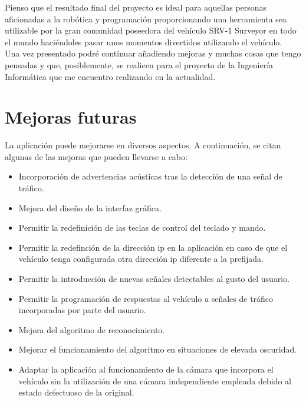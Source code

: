 Pienso que el resultado final del proyecto es ideal para aquellas personas aficionadas a la robótica y programación proporcionando una herramienta sea utilizable por la gran comunidad poseedora del vehículo SRV-1 Surveyor en todo el mundo haciéndoles pasar unos momentos divertidos utilizando el vehículo.\\

Una vez presentado podré continuar añadiendo mejoras y muchas cosas que tengo pensadas y que, posiblemente, se realicen para el proyecto de la Ingeniería Informática que me encuentro realizando en la actualidad.

\section{Mejoras futuras}

La aplicación puede mejorarse en diversos aspectos. A continuación, se citan algunas de las mejoras que pueden llevarse a cabo:

\begin{itemize}

\item Incorporación de advertencias acústicas tras la detección de una señal de tráfico.

\item Mejora del diseño de la interfaz gráfica.

\item Permitir la redefinición de las teclas de control del teclado y mando.

\item Permitir la redefinción de la dirección ip en la aplicación en caso de que el vehículo tenga configurada otra dirección ip diferente a la prefijada.

\item Permitir la introducción de nuevas señales detectables al gusto del usuario.

\item Permitir la programación de respuestas al vehículo a señales de tráfico incorporadas por parte del usuario.

\item Mejora del algoritmo de reconocimiento.

\item Mejorar el funcionamiento del algoritmo en situaciones de elevada oscuridad.

\item Adaptar la aplicación al funcionamiento de la cámara que incorpora el vehículo sin la utilización de una cámara independiente empleada debido al estado defectuoso de la original.

\end{itemize}


